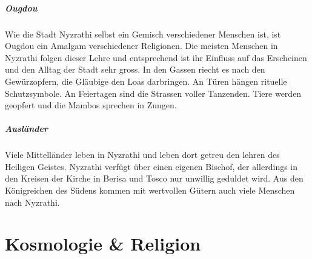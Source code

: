 \documentclass[10pt,twoside,twocolumn,openany]{book}
\begin{document}
\paragraph{Ougdou} Wie die Stadt Nyzrathi selbst ein Gemisch verschiedener Menschen ist, ist Ougdou ein Amalgam verschiedener Religionen. Die meisten Menschen in Nyzrathi folgen dieser Lehre und entsprechend ist ihr Einfluss auf das Erscheinen und den Alltag der Stadt sehr gross. In den Gassen riecht es nach den Gewürzopfern, die Gläubige den Loas darbringen. An Türen hängen rituelle Schutzsymbole. An Feiertagen sind die Strassen voller Tanzenden. Tiere werden geopfert und die Mambos sprechen in Zungen.

\paragraph{Ausländer} Viele Mittelländer leben in Nyzrathi und leben dort getreu den lehren des Heiligen Geistes. Nyzrathi verfügt über einen eigenen Bischof, der allerdings in den Kreisen der Kirche in Berisa und Tosco nur unwillig geduldet wird. Aus den Königreichen des Südens kommen mit wertvollen Gütern auch viele Menschen nach Nyzrathi.


%
%	
%
%



\chapter{Kosmologie \& Religion}
\end{document}
